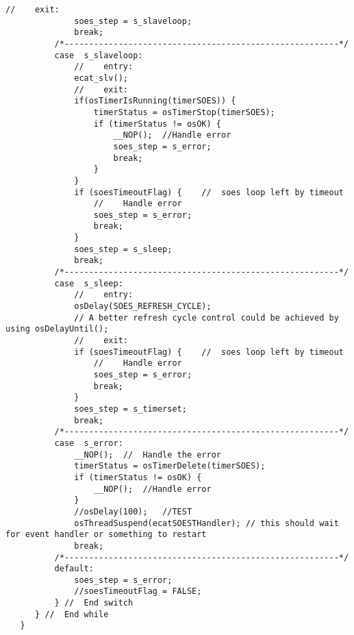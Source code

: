 \begin{lstlisting}[label=lst:soesAPP,caption={Main source code for SOES APP DSM.}]
              //	exit:
              soes_step = s_slaveloop;
              break;
          /*--------------------------------------------------------*/
          case  s_slaveloop:
              //	entry:
              ecat_slv();
              //	exit:
              if(osTimerIsRunning(timerSOES)) {
                  timerStatus = osTimerStop(timerSOES);
                  if (timerStatus != osOK) {
                      __NOP();	//Handle error
                      soes_step = s_error;
                      break;
                  }
              }
              if (soesTimeoutFlag) {	//	soes loop left by timeout
                  //	Handle error
                  soes_step = s_error;
                  break;
              }
              soes_step = s_sleep;
              break;
          /*--------------------------------------------------------*/
          case  s_sleep:
              //	entry:
              osDelay(SOES_REFRESH_CYCLE);
              // A better refresh cycle control could be achieved by using osDelayUntil();
              //	exit:
              if (soesTimeoutFlag) {	//	soes loop left by timeout
                  //	Handle error
                  soes_step = s_error;
                  break;
              }
              soes_step = s_timerset;
              break;
          /*--------------------------------------------------------*/
          case  s_error:
              __NOP();	//	Handle the error
              timerStatus = osTimerDelete(timerSOES);
              if (timerStatus != osOK) {
                  __NOP();	//Handle error
              }
              //osDelay(100);	//TEST
              osThreadSuspend(ecatSOESTHandler); // this should wait for event handler or something to restart
              break;
          /*--------------------------------------------------------*/
          default:
              soes_step = s_error;
              //soesTimeoutFlag = FALSE;
          }	//	End switch
      }	//	End while
   }
\end{lstlisting}

